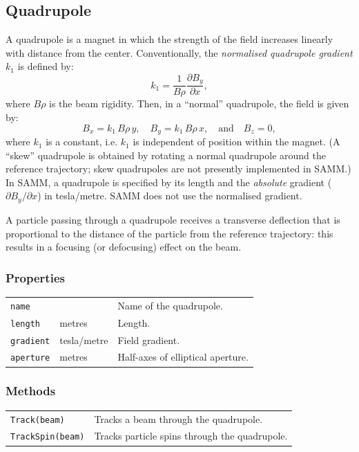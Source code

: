 \documentclass[11pt,twoside,a4paper]{article}
\begin{document}

\subsection{Quadrupole}
A quadrupole is a magnet in which the strength of the field increases
linearly with distance from the center.  Conventionally, the
\emph{normalised quadrupole gradient} $k_1$ is defined by:
\[
k_1 = \frac{1}{B\rho} \frac{\partial B_y}{\partial x},
\]
where $B\rho$ is the beam rigidity.  Then, in a ``normal'' quadrupole, the field
is given by:
\[
B_x = k_1\,B\rho\,  y, \quad B_y = k_1\,B\rho\, x,  \quad \textrm{and} \quad B_z = 0, 
\]
where $k_1$ is a constant, i.e. $k_1$ is independent of position within the magnet.
(A ``skew'' quadrupole is obtained by rotating a normal quadrupole around the
reference trajectory; skew quadrupoles are not presently implemented in SAMM.)
In SAMM, a quadrupole is specified by its length and the \emph{absolute} gradient
($\partial B_y / \partial x$) in tesla/metre.  SAMM does not use the normalised
gradient.

A particle passing through a quadrupole receives a transverse deflection that
is proportional to the distance of the particle from the reference trajectory:
this results in a focusing (or defocusing) effect on the beam.

\subsubsection{Properties}

\begin{tabular}{|l|l|l|}
\hline
\texttt{name} &              & Name of the quadrupole. \\
\texttt{length}              & metres       & Length.                     \\
\texttt{gradient}            & tesla/metre  & Field gradient. \\
\texttt{aperture} & metres & Half-axes of elliptical aperture. \\
\hline
\end{tabular}
\vspace{0.2in}

\subsubsection{Methods}

\begin{tabular}{|l|l|}
\hline
\texttt{Track(beam)} & Tracks a beam through the quadrupole. \\
\texttt{TrackSpin(beam)} & Tracks particle spins through the quadrupole. \\
\hline
\end{tabular}
\vspace{0.2in}
\end{document}
